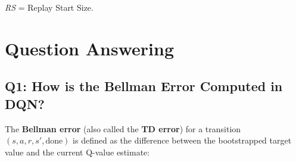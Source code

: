 \documentclass[12pt,a4paper]{report}
\begin{document}
\begin{table}[H]
\centering
\caption{Ablation results at the 600\,k-step checkpoint.
         Each value in \emph{20-seed Eval Scores} is the mean episode reward averaged over 20 inference
         episodes under the greedy policy (three independent runs per configuration).
         The \textbf{bolded} value in each row is the hyperparameter that differs from the baseline.}
\end{table}

\textit{RS} = Replay Start Size.


\newpage

\section{Question Answering}

\subsection*{Q1: How is the Bellman Error Computed in DQN?}

The \textbf{Bellman error} (also called the \textbf{TD error}) for a transition
$(s, a, r, s', \text{done})$ is defined as the difference between the bootstrapped target
value and the current Q-value estimate:
\end{document}
